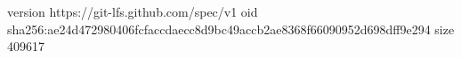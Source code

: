 version https://git-lfs.github.com/spec/v1
oid sha256:ae24d472980406fcfaccdaecc8d9bc49accb2ae8368f66090952d698dff9e294
size 409617
